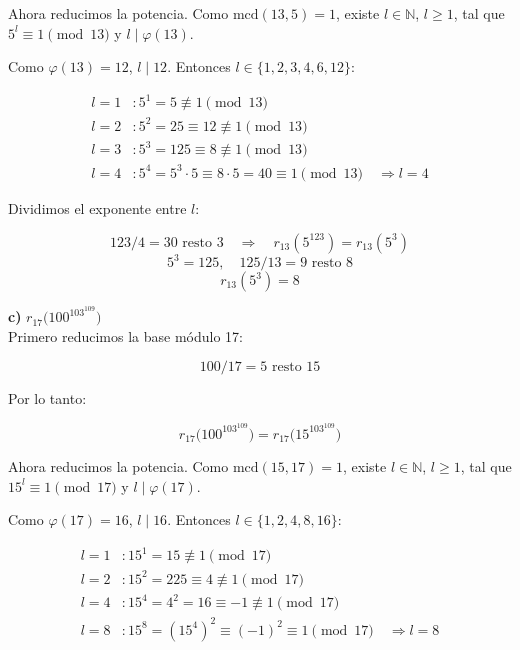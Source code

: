 \documentclass[a4paper,12pt]{article}
\begin{document}
\begin{ejercicio}[title=Ejercicio 28]

Ahora reducimos la potencia. Como $\mathrm{mcd}(13,5) = 1$, existe $l \in \mathbb{N}$, $l \ge 1$, tal que $5^l \equiv 1 \pmod{13}$ y $l \mid \varphi(13)$.

\vspace{0.5em}

Como $\varphi(13) = 12$, $l \mid 12$.  
Entonces $l \in \{1,2,3,4,6,12\}$:

\[
\begin{aligned}
l = 1 &: 5^1 = 5 \not\equiv 1 \pmod{13} \\
l = 2 &: 5^2 = 25 \equiv 12 \not\equiv 1 \pmod{13} \\
l = 3 &: 5^3 = 125 \equiv 8 \not\equiv 1 \pmod{13} \\
l = 4 &: 5^4 = 5^3\cdot5 \equiv 8\cdot5 = 40 \equiv 1 \pmod{13} \quad \Rightarrow l = 4
\end{aligned}
\]

Dividimos el exponente entre $l$:

\[
123 / 4 = 30 \text{ resto } 3 \quad \Rightarrow \quad r_{13}(5^{123}) = r_{13}(5^3)
\]
\[
5^3 = 125, \quad 125 / 13 = 9 \text{ resto } 8
\]
\[
r_{13}(5^3) = \boxed{8}
\]

\textbf{c)} $r_{17}\bigl(100^{103^{109}}\bigr)$ \\

Primero reducimos la base módulo 17:

\[
100 / 17 = 5 \text{ resto } 15
\]

Por lo tanto:

\[
r_{17}\bigl(100^{103^{109}}\bigr) = r_{17}\bigl(15^{103^{109}}\bigr)
\]

Ahora reducimos la potencia. Como $\mathrm{mcd}(15,17)=1$, existe $l\in\mathbb{N}$, $l\ge 1$, tal que $15^l\equiv 1\pmod{17}$ y $l\mid\varphi(17)$.

\vspace{0.5em}

Como $\varphi(17)=16$, $l\mid 16$.  
Entonces $l\in\{1,2,4,8,16\}$:

\[
\begin{aligned}
l=1 &: 15^1 = 15 \not\equiv 1 \pmod{17} \\
l=2 &: 15^2 = 225 \equiv 4 \not\equiv 1 \pmod{17} \\
l=4 &: 15^4 = 4^2 = 16 \equiv -1 \not\equiv 1 \pmod{17} \\
l=8 &: 15^8 = (15^4)^2 \equiv (-1)^2 \equiv 1 \pmod{17} \quad \Rightarrow l = 8
\end{aligned}
\]


\end{ejercicio}
\end{document}
